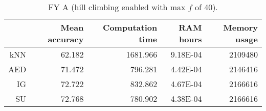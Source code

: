 \begin{table}[h]
\centering
\begin{tabular}{r|rrrr}
    & Mean accuracy & Computation time & RAM hours & Memory usage \\ \hline
kNN & 62.182                   & 1681.966         & 9.18E-04  & 2109480      \\
AED & 71.472                   & 796.281          & 4.42E-04  & 2146416      \\
IG  & 72.722                   & 832.862          & 4.67E-04  & 2166616      \\
SU  & 72.768                   & 780.902          & 4.38E-04  & 2166616     
\end{tabular}
\caption{FY A (hill climbing enabled with max $f$ of 40).}
\label{Table:FY_A_H}
\end{table}